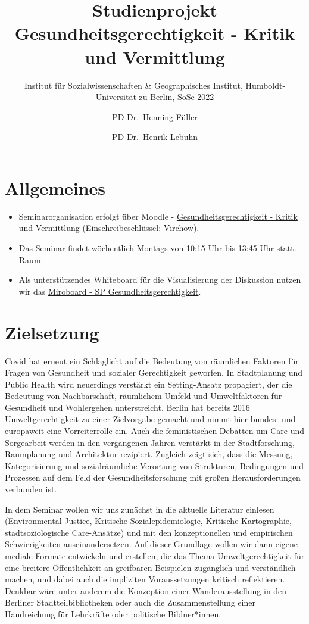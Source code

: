 \documentclass[
  ngerman,
]{article}
\title{Studienprojekt Gesundheitsgerechtigkeit - Kritik und Vermittlung}
\subtitle{Institut für Sozialwissenschaften \& Geographisches Institut, Humboldt-Universität zu Berlin, SoSe 2022}
\author{PD Dr.~Henning Füller \and PD Dr.~Henrik Lebuhn}
\date{}
\begin{document}
\maketitle

{
\hypersetup{linkcolor=}
\setcounter{tocdepth}{2}
\tableofcontents
}
\newpage

\hypertarget{allgemeines}{%
\section*{Allgemeines}\label{allgemeines}}

\begin{itemize}
\item
  Seminarorganisation erfolgt über Moodle - \href{https://moodle.hu-berlin.de/course/view.php?id=110268}{Gesundheitsgerechtigkeit - Kritik und Vermittlung} (Einschreibeschlüssel: Virchow).
\item
  Das Seminar findet wöchentlich Montags von 10:15 Uhr bis 13:45 Uhr statt. Raum:
\item
  Als unterstützendes Whiteboard für die Visualisierung der Diskussion nutzen wir das \href{https://miro.com/app/board/uXjVOF6MyAc=/?invite_link_id=891179698806}{Miroboard - SP Gesundheitsgerechtigkeit}.
\end{itemize}

\hypertarget{zielsetzung}{%
\section*{Zielsetzung}\label{zielsetzung}}

Covid hat erneut ein Schlaglicht auf die Bedeutung von räumlichen Faktoren für Fragen von Gesundheit und sozialer Gerechtigkeit geworfen. In Stadtplanung und Public Health wird neuerdings verstärkt ein Setting-Ansatz propagiert, der die Bedeutung von Nachbarschaft, räumlichem Umfeld und Umweltfaktoren für Gesundheit und Wohlergehen unterstreicht. Berlin hat bereits 2016 Umweltgerechtigkeit zu einer Zielvorgabe gemacht und nimmt hier bundes- und europaweit eine Vorreiterrolle ein. Auch die feministischen Debatten um Care und Sorgearbeit werden in den vergangenen Jahren verstärkt in der Stadtforschung, Raumplanung und Architektur rezipiert. Zugleich zeigt sich, dass die Messung, Kategorisierung und sozialräumliche Verortung von Strukturen, Bedingungen und Prozessen auf dem Feld der Gesundheitsforschung mit großen Herausforderungen verbunden ist.

In dem Seminar wollen wir uns zunächst in die aktuelle Literatur einlesen (Environmental Justice, Kritische Sozialepidemiologie, Kritische Kartographie, stadtsoziologische Care-Ansätze) und mit den konzeptionellen und empirischen Schwierigkeiten auseinandersetzen. Auf dieser Grundlage wollen wir dann eigene mediale Formate entwickeln und erstellen, die das Thema Umweltgerechtigkeit für eine breitere Öffentlichkeit an greifbaren Beispielen zugänglich und verständlich machen, und dabei auch die impliziten Voraussetzungen kritisch reflektieren. Denkbar wäre unter anderem die Konzeption einer Wanderausstellung in den Berliner Stadtteilbibliotheken oder auch die Zusammenstellung einer Handreichung für Lehrkräfte oder politische Bildner*innen.
\end{document}
